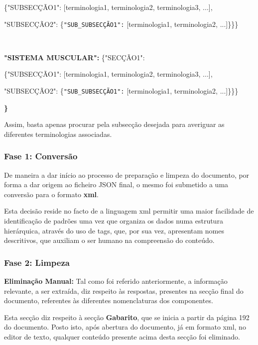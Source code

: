 \begin{center} 
    \{"SUBSECÇÃO1": [terminologia1, terminologia2, terminologia3, ...],
\end{center}

\begin{center}
    "SUBSECÇÃO2": \{\texttt{"SUB\_SUBSECÇÃO1":} [terminologia1, terminologia2, ...]\}\}\}
\end{center}

\\
\begin{center}
    \textbf{"SISTEMA MUSCULAR":}
    \{"SECÇÃO1":
\end{center}

\begin{center} 
    \{"SUBSECÇÃO1": [terminologia1, terminologia2, terminologia3, ...],
\end{center}
    
\begin{center}
    "SUBSECÇÃO2": \{\texttt{"SUB\_SUBSECÇÃO1":} [terminologia1, terminologia2, ...]\}\}\}
\end{center}
\textbf{\}}

Assim, basta apenas procurar pela subsecção desejada para averiguar as diferentes terminologias associadas.

\subsubsection{Fase 1: Conversão}
De maneira a dar início ao processo de preparação e limpeza do documento, por forma a dar origem ao ficheiro JSON final, o mesmo foi submetido a uma conversão para o formato \textbf{xml}.

Esta decisão reside no facto de a linguagem xml permitir uma maior facilidade de identificação de padrões uma vez que organiza os dados numa estrutura hierárquica, através do uso de tags, que, por sua vez, apresentam nomes descritivos, que auxiliam o ser humano na compreensão do conteúdo.


\subsubsection{Fase 2: Limpeza}
\textbf{Eliminação Manual:}
Tal como foi referido anteriormente, a informação relevante, a ser extraída, diz respeito às respostas, presentes na secção final do documento, referentes às diferentes nomenclaturas dos componentes.

Esta secção diz respeito à secção \textbf{Gabarito}, que se inicia a partir da página 192 do documento. Posto isto, após abertura do documento, já em formato xml, no editor de texto, qualquer conteúdo presente acima desta secção foi eliminado.

